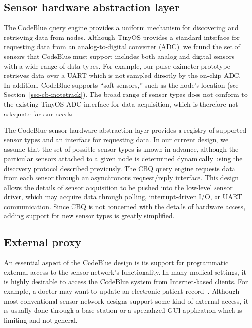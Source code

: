 \subsection{Sensor hardware abstraction layer}


The CodeBlue query engine provides a uniform mechanism for discovering
and retrieving data from nodes.  Although TinyOS provides a standard
interface for requesting data from an analog-to-digital converter
(ADC), we found the set of sensors that CodeBlue must support includes
both analog and digital sensors with a wide range of data types. For
example, our pulse oximeter prototype retrieves data over a UART which
is not sampled directly by the on-chip ADC. In addition, CodeBlue
supports ``soft sensors,'' such as the node's location (see
Section~\ref{sec-cb-motetrack}). The broad range of sensor types does not
conform to the existing TinyOS ADC interface for data acquisition,
which is therefore not adequate for our needs.

The CodeBlue sensor hardware abstraction layer provides a
registry of supported sensor types and an interface for requesting
data. In our current design, we assume that the set of possible sensor
types is known in advance, although the particular sensors attached to
a given node is determined dynamically using the discovery protocol
described previously. The CBQ query engine requests data from each sensor
through an asynchronous request/reply interface. This design allows
the details of sensor acquisition to be pushed into the low-level
sensor driver, which may acquire data through polling,
interrupt-driven I/O, or UART communication. Since CBQ is not
concerned with the details of hardware access, adding support for new
sensor types is greatly simplified.


\subsection{External proxy}

An essential aspect of the CodeBlue design is its support for
programmatic external access to the sensor network's functionality.
In many medical settings, it is highly desirable to access the
CodeBlue system from Internet-based clients.  For example, a doctor
may want to update an electronic patient record~\cite{irevive}.
Although most conventional sensor network designs support some kind of
external access, it is usually done through a base station or a
specialized GUI application which is limiting and not general.

